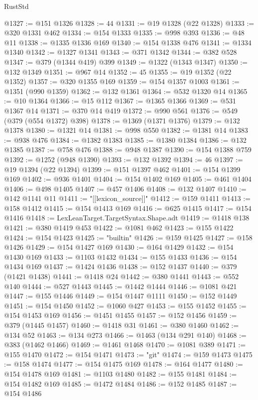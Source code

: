 \begin{lexlean}{RustStd}
\begin{coremodule}
@1327 := @151 @1326
@1328 := 44
@1331 := @19 @1328 (@22 @1328)
@1333 := @320 @1331 @462
@1334 := @154 @1333
@1335 := @998 @393
@1336 := @48 @11
@1338 := @1335 @1336 @169
@1340 := @154 @1338 @476
@1341 := @1334 @1340
@1342 := @1327 @1341
@1343 := @371 @1342
@1344 := @382 @528
@1347 := @379 (@1344 @419) @399
@1349 := @1322 (@1343 @1347)
@1350 := @132 @1349
@1351 := @967 @14
@1352 := 45
@1355 := @19 @1352 (@22 @1352)
@1357 := @320 @1355 @169
@1359 := @154 @1357 @1003
@1361 := @1351 (@990 @1359)
@1362 := @132 @1361
@1364 := @532 @1320 @14
@1365 := @10 @1364
@1366 := @15 @112
@1367 := @1365 @1366
@1369 := @531 @1367 @14
@1371 := @370 @14 @419
@1372 := @990 @561
@1376 := @549 (@379 (@554 @1372) @398)
@1378 := @1369 (@1371 @1376)
@1379 := @132 @1378
@1380 := @1321 @14
@1381 := @998 @550
@1382 := @1381 @14
@1383 := @938 @476
@1384 := @1382 @1383
@1385 := @1380 @1384
@1386 := @132 @1385
@1387 := @758 @476
@1388 := @948 @1387
@1390 := @154 @1388 @759
@1392 := @1252 (@948 @1390)
@1393 := @132 @1392
@1394 := 46
@1397 := @19 @1394 (@22 @1394)
@1399 := @151 @1397 @462
@1401 := @154 @1399 @169
@1402 := @936 @1401
@1404 := @154 @1402 @169
@1405 := @461 @1404
@1406 := @498 @1405
@1407 := @457 @1406
@1408 := @132 @1407
@1410 := @142 @1141 @11
@1411 := "[[lexicon_source]]"
@1412 := @159 @1411
@1413 := @158 @1412
@1415 := @154 @1413 @169
@1416 := @625 @1415
@1417 := @154 @1416
@1418 := LexLeanTarget.TargetSyntax.Shape.adt
@1419 := @1418 @138
@1421 := @380 @1419 @453
@1422 := @1081 @462
@1423 := @155 @1422
@1424 := @154 @1423
@1425 := "builtin"
@1426 := @159 @1425
@1427 := @158 @1426
@1429 := @154 @1427 @169
@1430 := @164 @1429
@1432 := @154 @1430 @169
@1433 := @1103 @1432
@1434 := @155 @1433
@1436 := @154 @1434 @169
@1437 := @1424 @1436
@1438 := @152 @1437
@1440 := @379 (@1421 @1438)
@1441 := @1418 @24
@1442 := @380 @1441
@1443 := @552 @140
@1444 := @527 @1443
@1445 := @1442 @1444
@1446 := @1081 @421
@1447 := @155 @1446
@1449 := @154 @1447 @1111
@1450 := @152 @1449
@1451 := @154 @1450
@1452 := @1060 @427
@1453 := @155 @1452
@1455 := @154 @1453 @169
@1456 := @1451 @1455
@1457 := @152 @1456
@1459 := @379 (@1445 @1457)
@1460 := @1418 @31
@1461 := @380 @1460
@1462 := @134 @52
@1463 := @134 @273
@1466 := @1463 (@134 @291 @140)
@1468 := @383 (@1462 @1466)
@1469 := @1461 @1468
@1470 := @1081 @389
@1471 := @155 @1470
@1472 := @154 @1471
@1473 := "git"
@1474 := @159 @1473
@1475 := @158 @1474
@1477 := @154 @1475 @169
@1478 := @164 @1477
@1480 := @154 @1478 @169
@1481 := @1103 @1480
@1482 := @155 @1481
@1484 := @154 @1482 @169
@1485 := @1472 @1484
@1486 := @152 @1485
@1487 := @154 @1486

\end{coremodule}
\end{lexlean}
